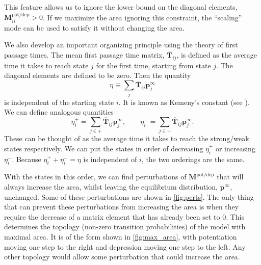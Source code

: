\documentclass{article} %
\newcommand{\pr}{\mathbf{p}}
\newcommand{\eq}{\pr^\infty}
\newcommand{\fpt}{\mathbf{T}}
\newcommand{\fptb}{\overline{\fpt}}
\newcommand{\M}{\mathbf{M}}
\newcommand{\potdep}{^{\text{pot/dep}}}
\begin{document}
This feature allows us to ignore the lower bound on the diagonal elements, $\M\potdep_{ii}>0$.
If we maximize the area ignoring this constraint, the ``scaling'' mode can be used to satisfy it without changing the area.

We also develop an important organizing principle using the theory of first passage times.
The mean first passage time matrix, $\fptb_{ij}$, is defined as the average time it takes to reach state $j$ for the first time, starting from state $j$.
The diagonal elements are defined to be zero.
Then the quantity
%
\begin{equation}\label{eq:kemenyconst}
  \eta \equiv \sum_j \fptb_{ij}\eq_j
\end{equation}
%
is independent of the starting state $i$.
It is known as Kemeny's constant (see \cite[\S4.4]{kemeny1960finite}).
We can define analogous quantities
%
\begin{equation}\label{eq:kemenypm}
   \eta^+_i = \sum_{j\in+} \fptb_{ij} \eq_j,
   \qquad
   \eta^-_i = \sum_{j\in-} \fptb_{ij} \eq_j.
\end{equation}
%
These can be thought of as the average time it takes to reach the strong/weak states respectively.
We can put the states in order of decreasing $\eta^+_i$ or increasing $\eta^-_i$.
Because $\eta^+_i+\eta^-_i=\eta$ is independent of $i$, the two orderings are the same.

With the states in this order, we can find perturbations of $\M\potdep$ that will always increase the area, whilst leaving the equilibrium distribution, $\eq$, unchanged.
Some of these perturbations are shown in \autoref{fig:perts}.
The only thing that can prevent these perturbations from increasing the area is when they require the decrease of a matrix element that has already been set to 0.
This determines the topology (non-zero transition probabilities) of the model with maximal area.
It is of the form shown in \autoref{fig:max_area}, with potentiation moving one step to the right and depression moving one step to the left.
Any other topology would allow some perturbation that could increase the area.
\end{document}
